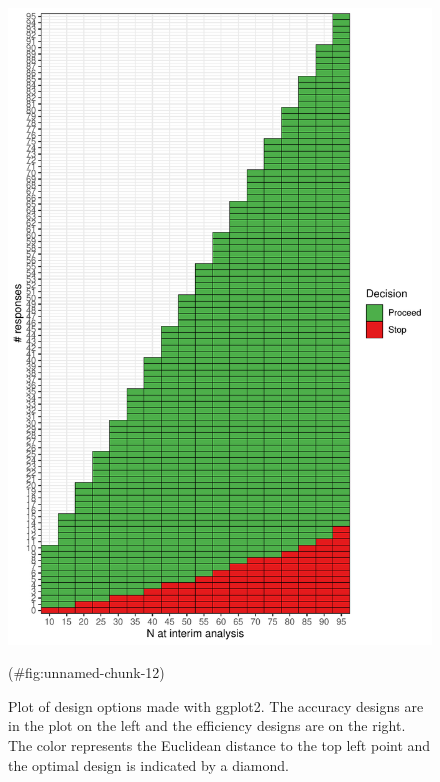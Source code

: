 \begin{Schunk}
\begin{figure}
\includegraphics[width=1.1\linewidth]{zabor-hobbs-kane_files/figure-latex/unnamed-chunk-12-1} \caption[Plot of design options made with ggplot2]{Plot of design options made with ggplot2. The accuracy designs are in the plot on the left and the efficiency designs are on the right. The color represents the Euclidean distance to the top left point and the optimal design is indicated by a diamond.}(\#fig:unnamed-chunk-12)
\end{figure}
\end{Schunk}

